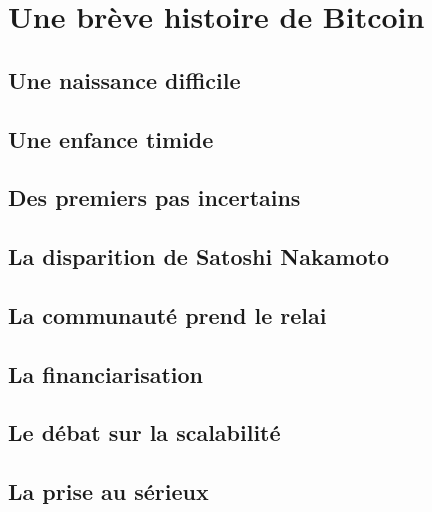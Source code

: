 \chapter{Une brève histoire de Bitcoin}

\section{Une naissance difficile}

\section{Une enfance timide}

\section{Des premiers pas incertains}

\section{La disparition de Satoshi Nakamoto}

\section{La communauté prend le relai}

\section{La financiarisation}

\section{Le débat sur la scalabilité}

\section{La prise au sérieux}